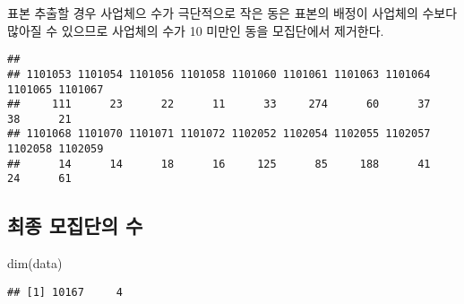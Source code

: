 \documentclass[
]{book}
\newenvironment{Shaded}{\begin{snugshade}}{\end{snugshade}}
\newcommand{\AttributeTok}[1]{\textcolor[rgb]{0.77,0.63,0.00}{#1}}
\newcommand{\CommentTok}[1]{\textcolor[rgb]{0.56,0.35,0.01}{\textit{#1}}}
\newcommand{\DecValTok}[1]{\textcolor[rgb]{0.00,0.00,0.81}{#1}}
\newcommand{\FunctionTok}[1]{\textcolor[rgb]{0.00,0.00,0.00}{#1}}
\newcommand{\NormalTok}[1]{#1}
\newcommand{\OtherTok}[1]{\textcolor[rgb]{0.56,0.35,0.01}{#1}}
\newcommand{\SpecialCharTok}[1]{\textcolor[rgb]{0.00,0.00,0.00}{#1}}
\begin{document}
표본 추출할 경우 사업체으 수가 극단적으로 작은 동은 표본의 배정이 사업체의 수보다 많아질 수 있으므로
사업체의 수가 10 미만인 동을 모집단에서 제거한다.

\begin{Shaded}
\end{Shaded}

\begin{verbatim}
## 
## 1101053 1101054 1101056 1101058 1101060 1101061 1101063 1101064 1101065 1101067 
##     111      23      22      11      33     274      60      37      38      21 
## 1101068 1101070 1101071 1101072 1102052 1102054 1102055 1102057 1102058 1102059 
##      14      14      18      16     125      85     188      41      24      61
\end{verbatim}

\hypertarget{uxcd5cuxc885-uxbaa8uxc9d1uxb2e8uxc758-uxc218}{%
\subsection{최종 모집단의 수}\label{uxcd5cuxc885-uxbaa8uxc9d1uxb2e8uxc758-uxc218}}

\begin{Shaded}
\begin{Highlighting}[]
\FunctionTok{dim}\NormalTok{(data)}
\end{Highlighting}
\end{Shaded}

\begin{verbatim}
## [1] 10167     4
\end{verbatim}
\end{document}
